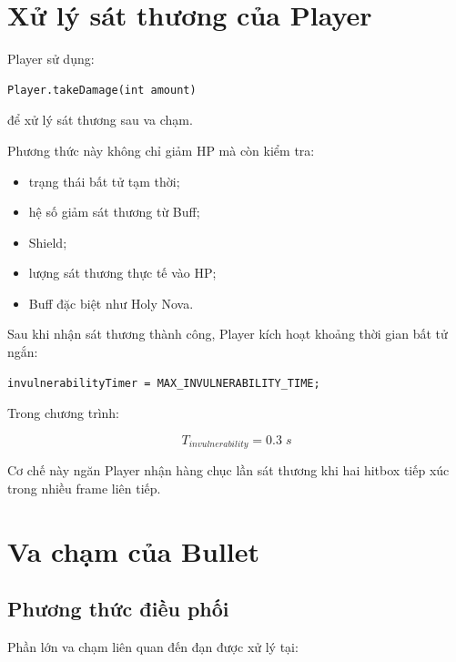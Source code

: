 \documentclass[12pt,a4paper]{report}
\begin{document}
    \section{Xử lý sát thương của Player}

    Player sử dụng:

    \begin{verbatim}
Player.takeDamage(int amount)
    \end{verbatim}

    để xử lý sát thương sau va chạm.

    Phương thức này không chỉ giảm HP mà còn kiểm tra:

    \begin{itemize}
        \item trạng thái bất tử tạm thời;
        \item hệ số giảm sát thương từ Buff;
        \item Shield;
        \item lượng sát thương thực tế vào HP;
        \item Buff đặc biệt như Holy Nova.
    \end{itemize}

    Sau khi nhận sát thương thành công, Player kích hoạt khoảng thời
    gian bất tử ngắn:

    \begin{verbatim}
invulnerabilityTimer = MAX_INVULNERABILITY_TIME;
    \end{verbatim}

    Trong chương trình:

    \[
        T_{invulnerability}=0.3\;s
    \]

    Cơ chế này ngăn Player nhận hàng chục lần sát thương khi hai hitbox
    tiếp xúc trong nhiều frame liên tiếp.




    \section{Va chạm của Bullet}

    \subsection{Phương thức điều phối}

    Phần lớn va chạm liên quan đến đạn được xử lý tại:
\end{document}
